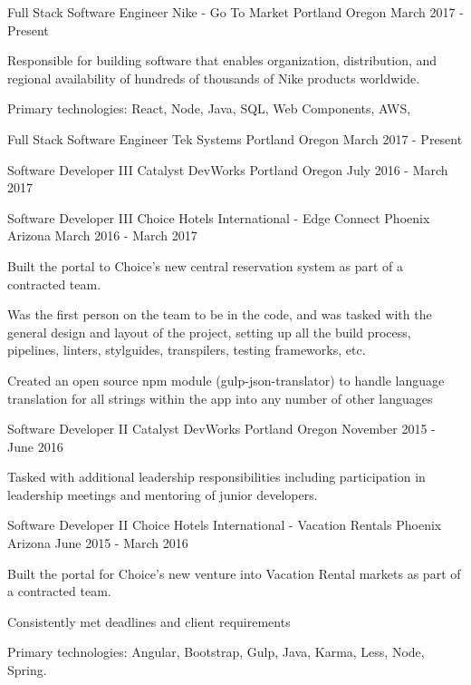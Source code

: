 
\begin{cventries}

  \cventry
  {Full Stack Software Engineer}
  {Nike - Go To Market}
  {Portland Oregon}
  {March 2017 - Present}
  {
    \begin{cvitems}
      \item {Responsible for building software that enables organization, distribution, and regional availability of hundreds of thousands of Nike products worldwide.}
      \item {Primary technologies: React, Node, Java, SQL, Web Components, AWS, }
    \end{cvitems}
  }

  \cventry
  {Full Stack Software Engineer}
  {Tek Systems}
  {Portland Oregon}
  {March 2017 - Present}
  {}

  \cventry
  {Software Developer III}
  {Catalyst DevWorks}
  {Portland Oregon}
  {July 2016 - March 2017}
  {}

  \cventry
    {Software Developer III}
    {Choice Hotels International - Edge Connect}
    {Phoenix Arizona}
    {March 2016 - March 2017}
    {
      \begin{cvitems}
        \item {Built the portal to Choice's new central reservation system as part of a contracted team.}
        \item {Was the first person on the team to be in the code, and was tasked with the general design and layout of the project, setting up all the build process, pipelines, linters, stylguides, transpilers, testing frameworks, etc.}
        \item {Created an open source npm module (gulp-json-translator) to handle language translation for all strings within the app into any number of other languages}
      \end{cvitems}
    }

  \cventry
    {Software Developer II}
    {Catalyst DevWorks}
    {Portland Oregon}
    {November 2015 - June 2016}
    {
      \begin{cvitems}
        \item {Tasked with additional leadership responsibilities including participation in leadership meetings and mentoring of junior developers.}
      \end{cvitems}
    }

  \cventry
    {Software Developer II}
    {Choice Hotels International - Vacation Rentals}
    {Phoenix Arizona}
    {June 2015 - March 2016}
    {
      \begin{cvitems}
        \item {Built the portal for Choice's new venture into Vacation Rental markets as part of a contracted team.}
        \item {Consistently met deadlines and client requirements}
        \item {Primary technologies: Angular, Bootstrap, Gulp, Java, Karma, Less, Node, Spring.}
      \end{cvitems}
    }


\end{cventries}
